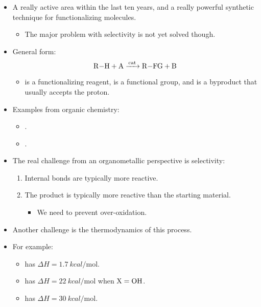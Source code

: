 \documentclass[../notes.tex]{subfiles}
\begin{document}
\begin{itemize}
    \item {}A really active area within the last ten years, and a really powerful synthetic technique for functionalizing molecules.
    \begin{itemize}
        \item The major problem with selectivity is not yet solved though.
    \end{itemize}
    \item General form:
    \begin{equation*}
        \ce{R-H + A ->[{cat}] R-FG + B}
    \end{equation*}
    \begin{itemize}
        \item {} is a functionalizing reagent,  is a functional group, and  is a byproduct that usually accepts the proton.
    \end{itemize}
    \item Examples from organic chemistry:
    \begin{itemize}
        \item {}.
        \item {}.
    \end{itemize}
    \item The real challenge from an organometallic perspective is selectivity:
    \begin{enumerate}
        \item Internal  bonds are typically more reactive.
        \item The product is typically more reactive than the starting material.
        \begin{itemize}
            \item We need to prevent over-oxidation.
        \end{itemize}
    \end{enumerate}
    \item Another challenge is the thermodynamics of this process.
    \item For example:
    \begin{itemize}
        \item {} has $\Delta H=\SI{1.7}{kcal\per\mole}$.
        \item {} has $\Delta H= \SI{22}{kcal\per\mole}$ when $\ce{X}=\ce{OH}$.
        \item {} has $\Delta H=\SI{30}{kcal\per\mole}$.

\end{itemize}
\end{itemize}
\end{document}
